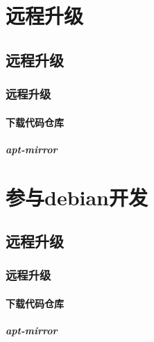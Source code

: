 \documentclass[a4paper,10pt]{article}
\begin{document}
\begin{CJK}{UTF8}{gbsn}
\part{远程升级}
\chapter{远程升级}
\section{远程升级}
\subsection{下载代码仓库}
\subsubsection{apt-mirror}

\part{参与debian开发}
\chapter{远程升级}
\section{远程升级}
\subsection{下载代码仓库}
\subsubsection{apt-mirror}



\end{CJK}
\end{document}
